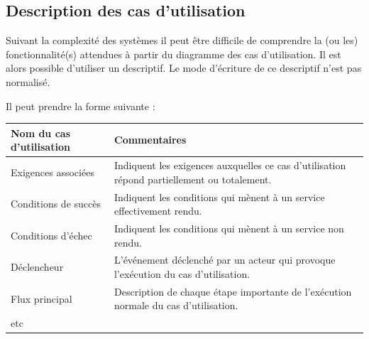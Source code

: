 \documentclass[11pt,oneside]{article}
\begin{document}
\subsection{Description des cas d'utilisation}

Suivant la complexité des systèmes il peut être difficile de comprendre la (ou les) fonctionnalité(s) attendues à partir du diagramme des cas d'utilisation. Il est alors possible d'utiliser un descriptif. Le mode d'écriture de ce descriptif n'est pas normalisé. 

Il peut prendre la forme suivante :
\begin{center}
\begin{tabular}{|p{4cm}|p{10cm}|}
\hline 
Nom du cas d’utilisation & Commentaires \\ \hline
Exigences associées & Indiquent les exigences auxquelles ce cas d’utilisation répond partiellement ou totalement. \\ \hline
Conditions de succès & Indiquent les conditions qui mènent à un service effectivement rendu. \\ \hline
Conditions d’échec & Indiquent les conditions qui mènent à un service non rendu. \\ \hline
Déclencheur & L’événement déclenché par un acteur qui provoque l’exécution du cas d’utilisation. \\ \hline
Flux principal & Description de chaque étape importante de l’exécution normale du cas d’utilisation. \\ \hline
etc &  \\ \hline
\end{tabular}
\end{center}
\end{document}
